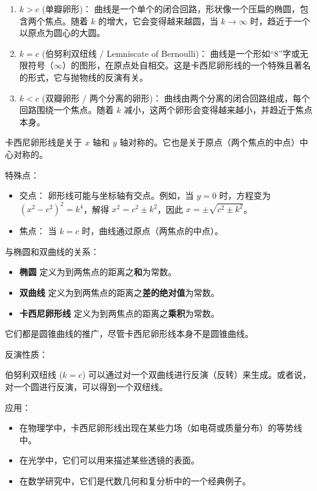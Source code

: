 \begin{enumerate}
	\item $k > c$ (单瓣卵形)：
曲线是一个单个的闭合回路，形状像一个压扁的椭圆，包含两个焦点。随着 $k$ 的增大，它会变得越来越圆，当 $k \to \infty$ 时，趋近于一个以原点为圆心的大圆。
	\item $k = c$ (伯努利双纽线 / Lemniscate of Bernoulli)：
曲线是一个形如“8”字或无限符号（$\infty$）的图形，在原点处自相交。这是卡西尼卵形线的一个特殊且著名的形式，它与抛物线的反演有关。
	\item $k < c$ (双瓣卵形 / 两个分离的卵形)：
曲线由两个分离的闭合回路组成，每个回路围绕一个焦点。随着 $k$ 减小，这两个卵形会变得越来越小，并趋近于焦点本身。
\end{enumerate}

卡西尼卵形线是关于 $x$ 轴和 $y$ 轴对称的。它也是关于原点（两个焦点的中点）中心对称的。

特殊点：

\begin{itemize}
	\item 交点：
卵形线可能与坐标轴有交点。例如，当 $y=0$ 时，方程变为 $(x^2-c^2)^2 = k^4$，解得 $x^2 = c^2 \pm k^2$，因此 $x = \pm\sqrt{c^2 \pm k^2}$。
	\item 焦点：
当 $k=c$ 时，曲线通过原点（两焦点的中点）。
\end{itemize}

与椭圆和双曲线的关系：

\begin{itemize}
	\item \textbf{椭圆} 定义为到两焦点的距离之\textbf{和}为常数。
	\item \textbf{双曲线} 定义为到两焦点的距离之\textbf{差的绝对值}为常数。
	\item \textbf{卡西尼卵形线} 定义为到两焦点的距离之\textbf{乘积}为常数。
\end{itemize}

它们都是圆锥曲线的推广，尽管卡西尼卵形线本身不是圆锥曲线。

反演性质：

伯努利双纽线 ($k=c$) 可以通过对一个双曲线进行反演（反转）来生成。或者说，对一个圆进行反演，可以得到一个双纽线。

应用：

\begin{itemize}
	\item 在物理学中，卡西尼卵形线出现在某些力场（如电荷或质量分布）的等势线中。
	\item 在光学中，它们可以用来描述某些透镜的表面。
	\item 在数学研究中，它们是代数几何和复分析中的一个经典例子。
\end{itemize}

